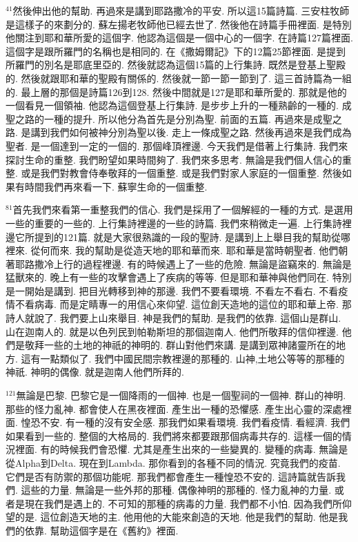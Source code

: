 \documentclass{book}
\begin{document}
$^{41}$然後伸出他的幫助.
再過來是講到耶路撒冷的平安.
所以這15篇詩篇.
三安柱牧師是這樣子的來劃分的.
蘇左揚老牧師他已經去世了.
然後他在詩篇手冊裡面.
是特別他關注到耶和華所愛的這個字.
他認為這個是一個中心的一個字.
在詩篇127篇裡面.
這個字是跟所羅門的名稱也是相同的.
在《撒姆爾記》下的12篇25節裡面.
是提到所羅門的別名是耶底里亞的.
然後就認為這個15篇的上行集詩.
既然是登基上聖殿的.
然後就跟耶和華的聖殿有關係的.
然後就一節一節一節到了.
這三首詩篇為一組的.
最上層的那個是詩篇126到128.
然後中間就是127是耶和華所愛的.
那就是他的一個看見一個領袖.
他認為這個登基上行集詩.
是步步上升的一種熟齡的一種的.
成聖之路的一種的提升.
所以他分為首先是分別為聖.
前面的五篇.
再過來是成聖之路.
是講到我們如何被神分別為聖以後.
走上一條成聖之路.
然後再過來是我們成為聖者.
是一個達到一定的一個的.
那個峰頂裡邊.
今天我們是借著上行集詩.
我們來探討生命的重整.
我們盼望如果時間夠了.
我們來多思考.
無論是我們個人信心的重整.
或是我們對教會侍奉敬拜的一個重整.
或是我們對家人家庭的一個重整.
然後如果有時間我們再來看一下.
蘇寧生命的一個重整.

$^{81}$首先我們來看第一重整我們的信心.
我們是採用了一個解經的一種的方式.
是選用一些的重要的一些的.
上行集詩裡邊的一些的詩篇.
我們來稍微走一遍.
上行集詩裡邊它所提到的121篇.
就是大家很熟識的一段的聖詩.
是講到上上舉目我的幫助從哪裡來.
從何而來.
我的幫助是從造天地的耶和華而來.
耶和華是當時朝聖者.
他們朝著耶路撒冷上行的過程裡邊.
有的時候遇上了一些的危險.
無論是盜竊來的.
無論是猛獸來的.
晚上有一些的攻擊會遇上了疾病的等等.
但是耶和華神與他們同在.
特別是一開始是講到.
把目光轉移到神的那邊.
我們不要看環境.
不看左不看右.
不看疫情不看病毒.
而是定睛專一的用信心來仰望.
這位創天造地的這位的耶和華上帝.
那詩人就說了.
我們要上山來舉目.
神是我們的幫助.
是我們的依靠.
這個山是群山.
山在迦南人的.
就是以色列民到帕勒斯坦的那個迦南人.
他們所敬拜的信仰裡邊.
他們是敬拜一些的土地的神祇的神明的.
群山對他們來講.
是講到眾神諸靈所在的地方.
這有一點類似了.
我們中國民間宗教裡邊的那種的.
山神,土地公等等的那種的神祇.
神明的偶像.
就是迦南人他們所拜的.

$^{121}$無論是巴黎.
巴黎它是一個降雨的一個神.
也是一個聖祠的一個神.
群山的神明.
那些的怪力亂神.
都會使人在黑夜裡面.
產生出一種的恐懼感.
產生出心靈的深處裡面.
惶恐不安.
有一種的沒有安全感.
那我們如果看環境.
我們看疫情.
看經濟.
我們如果看到一些的.
整個的大格局的.
我們將來都要跟那個病毒共存的.
這樣一個的情況裡面.
有的時候我們會恐懼.
尤其是產生出來的一些變異的.
變種的病毒.
無論是從Alpha到Delta.
現在到Lambda.
那你看到的各種不同的情況.
究竟我們的疫苗.
它們是否有防禦的那個功能呢.
那我們都會產生一種惶恐不安的.
這詩篇就告訴我們.
這些的力量.
無論是一些外邦的那種.
偶像神明的那種的.
怪力亂神的力量.
或者是現在我們是遇上的.
不可知的那種的病毒的力量.
我們都不小怕.
因為我們所仰望的是.
這位創造天地的主.
他用他的大能來創造的天地.
他是我們的幫助.
他是我們的依靠.
幫助這個字是在《舊約》裡面.
\end{document}
